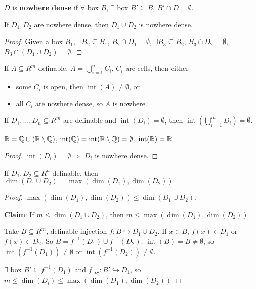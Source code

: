 \documentclass[11pt]{article}
\DeclareMathOperator{\tint}{\text{int}}
\begin{document}
\begin{definition}[]
\(D\) is \textbf{nowhere dense} if \(\forall\) box \(B\), \(\exists\) box \(B'\subseteq B\), \(B'\cap D=\emptyset\).
\end{definition}

\begin{lemma}[]
If \(D_1,D_2\) are nowhere dense, then \(D_1\cup D_2\) is nowhere dense.
\end{lemma}

\begin{proof}
Given a box \(B_1\), \(\exists B_2\subseteq B_1\), \(B_2\cap D_1=\emptyset\), \(\exists B_3\subseteq B_2\), \(B_3\cap D_2=\emptyset\), \(B_3\cap(D_1\cup D_2)=\emptyset\).
\end{proof}

If \(A\subseteq R^m\) definable, \(A=\bigcup_{i=1}^nC_i\), \(C_i\) are cells, then either
\begin{itemize}
\item some \(C_i\) is open, then \(\tint(A)\neq\emptyset\), or
\item all \(C_i\) are nowhere dense, so \(A\) is nowhere
\end{itemize}

\begin{corollary}[]
If \(D_1,\dots,D_n\subseteq R^m\) are definable and \(\tint(D_i)=\emptyset\), then \(\tint(\bigcup_{i=1}^mD_i)=\emptyset\).
\end{corollary}

\(\mathbb{R}=\mathbb{Q}\cup(\mathbb{R}\setminus\mathbb{Q})\), \(\tint(\Q)=\tint(\R\setminus\Q)=\emptyset\), \(\tint(\R)=\R\)

\begin{proof}
\(\tint(D_i)=\emptyset\Rightarrow\) \(D_i\) is nowhere dense.
\end{proof}

\begin{theorem}[]
If \(D_1,D_2\subseteq R^n\) definable, then \(\dim(D_1\cup D_2)=\max(\dim(D_1),\dim(D_2))\)
\end{theorem}

\begin{proof}
\(\max(\dim(D_1),\dim(D_2))\le\dim(D_1\cup D_2)\).

\textbf{Claim}: If \(m\le\dim(D_1\cup D_2)\), then \(m\le\max(\dim(D_1),\dim(D_2))\)

Take \(B\subseteq R^m\), definable injection \(f:B\hookrightarrow D_1\cup D_2\). If \(x\in B\), \(f(x)\in D_1\) or \(f(x)\in D_2\).
So \(B=f^{-1}(D_1)\cup f^{-1}(D_2)\). \(\tint(B)=B\neq\emptyset\), so \(\tint(f^{-1}(D_1))\neq\emptyset\)
or \(\tint(f^{-1}(D_2))\neq\emptyset\).

\(\exists\) box \(B'\subseteq f^{-1}(D_1)\) and \(f|_{B'}:B'\hookrightarrow D_1\), so \(m\le\dim(D_i)\le\max(\dim(D_1),\dim(D_2))\)
\end{proof}
\end{document}
